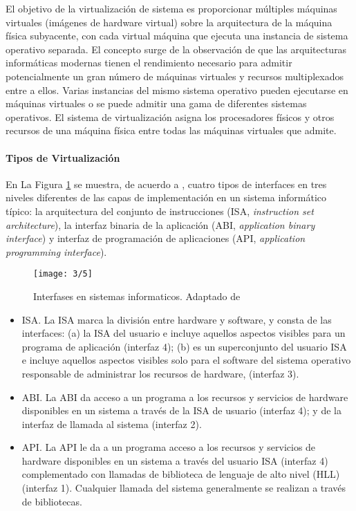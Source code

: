 	El objetivo de la virtualización de sistema  es proporcionar múltiples máquinas virtuales (imágenes de hardware virtual) sobre la arquitectura de la máquina física subyacente, con cada virtual máquina que ejecuta una instancia de sistema operativo separada. El concepto surge de la 	observación de que las arquitecturas informáticas modernas tienen el rendimiento necesario para 	admitir potencialmente un gran número de máquinas virtuales y recursos multiplexados entre
	a ellos. Varias instancias del mismo sistema operativo pueden ejecutarse en máquinas virtuales o se puede admitir una gama de diferentes sistemas operativos. El sistema de virtualización asigna los procesadores físicos y otros recursos de una máquina física entre todas las máquinas virtuales que admite.
	
	\paragraph{Tipos de Virtualización} 
 
	
	En La Figura \ref{fig:virtualizacion-API} se  muestra, de acuerdo a ,  cuatro tipos de interfaces en tres niveles diferentes de las capas de implementación en un sistema informático típico: la arquitectura del conjunto de instrucciones (ISA, \textit{instruction set architecture}), la interfaz binaria de la aplicación (ABI, \textit{application binary interface}) y  interfaz de programación de aplicaciones (API, \textit{application programming interface}).
	
			 \begin{figure} %
		\texttt{[image: 3/5]}	 
		\caption{Interfases en sistemas informaticos. Adaptado  de \cite{Smith2005}}
		\label{fig:virtualizacion-API}
	\end{figure}
	
	
	\begin{itemize}
		\item ISA.  La ISA marca la división entre hardware y software, y consta de las interfaces: (a) la ISA del usuario e incluye aquellos aspectos visibles para un programa de aplicación (interfaz 4); (b)  es un superconjunto del usuario ISA e incluye aquellos aspectos visibles solo para el software del sistema operativo responsable de administrar los recursos de hardware, (interfaz 3).
	
		\item ABI. La ABI da acceso a un programa a los recursos y servicios de hardware disponibles en un sistema a través de la ISA de usuario (interfaz 4); y de la interfaz de llamada al sistema (interfaz 2).
	 
		\item API. La API le da a un programa acceso a los recursos y servicios de hardware disponibles en un sistema a través del usuario ISA (interfaz 4) complementado con llamadas de biblioteca de lenguaje de alto nivel (HLL) (interfaz 1). Cualquier llamada del sistema generalmente se realizan a través de bibliotecas.
	\end{itemize}


